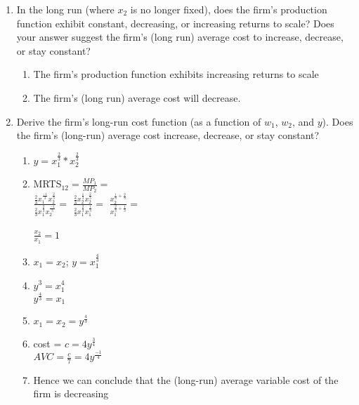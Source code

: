 \documentclass[11pt]{article}
\begin{document}
\begin{enumerate}
\begin{enumerate}
        \item In the long run (where $x_{2}$ is no longer fixed), does the firm's production function exhibit constant, decreasing, or increasing returns to scale? Does your answer suggest the firm's (long run) average cost to increase, decrease, or stay constant?
        \begin{enumerate}
            \item The firm's production function exhibits increasing returns to scale
            \item The firm's (long run) average cost will decrease.
        \end{enumerate}

        \item Derive the firm's long-run cost function (as a function of $w_{1}$, $w_{2}$, and $y$). Does the firm's (long-run) average cost increase, decrease, or stay constant?
        \begin{enumerate}
            \item $y = x_1^{\frac{2}{3}}*x_2^{\frac{2}{3}}$
            \item MRTS$_{12} = \frac{MP_1}{MP_2} =$\\
            $\frac{\frac{2}{3}x_1^{\frac{-1}{3}}x_2^{\frac{2}{3}}}{\frac{2}{3}x_1^{\frac{2}{3}}x_2^{\frac{-1}{3}}} = $
            $\frac{\frac{2}{3}x_2^{\frac{1}{3}}x_2^{\frac{2}{3}}}{\frac{2}{3}x_1^{\frac{2}{3}}x_1^{\frac{1}{3}}} = $
            $\frac{x_2^{\frac{1}{3}+{\frac{2}{3}}}}{x_1^{\frac{2}{3}+{\frac{1}{3}}}} = $\\ \\
            $\frac{x_2}{x_1}=1$
            \item $x_1 = x_2$; $y = x_1^{\frac{4}{3}}$
            \item $y^3 = x_1^4$\\
            $y^{\frac{4}{3}} = x_1$
            \item $x_1 = x_2 = y^{\frac{4}{3}}$
            \item cost = $c = 4y^{\frac{3}{4}}$\\
            $AVC = \frac{c}{7} = 4y^{\frac{-1}{4}}$
            \item Hence we can conclude that the (long-run) average variable cost of the firm is decreasing
        \end{enumerate}
    \end{enumerate}

\end{enumerate}
\end{document}
